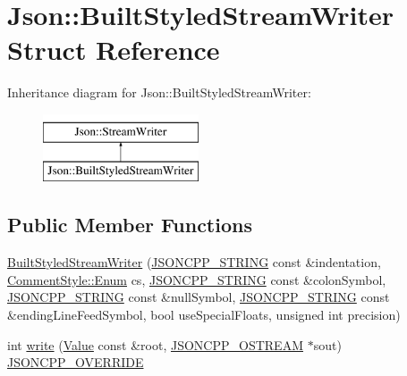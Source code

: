 \hypertarget{struct_json_1_1_built_styled_stream_writer}{}\section{Json\+:\+:Built\+Styled\+Stream\+Writer Struct Reference}
\label{struct_json_1_1_built_styled_stream_writer}
Inheritance diagram for Json\+:\+:Built\+Styled\+Stream\+Writer\+:\begin{figure}[H]
\begin{center}
\leavevmode
\includegraphics[height=2.000000cm]{struct_json_1_1_built_styled_stream_writer}
\end{center}
\end{figure}
\subsection*{Public Member Functions}
\begin{DoxyCompactItemize}
\item 
\hyperlink{struct_json_1_1_built_styled_stream_writer_adf11b7d1ee3c68d096b7c662ee85948e}{Built\+Styled\+Stream\+Writer} (\hyperlink{config_8h_a1e723f95759de062585bc4a8fd3fa4be}{J\+S\+O\+N\+C\+P\+P\+\_\+\+S\+T\+R\+I\+NG} const \&indentation, \hyperlink{struct_json_1_1_comment_style_a51fc08f3518fd81eba12f340d19a3d0c}{Comment\+Style\+::\+Enum} cs, \hyperlink{config_8h_a1e723f95759de062585bc4a8fd3fa4be}{J\+S\+O\+N\+C\+P\+P\+\_\+\+S\+T\+R\+I\+NG} const \&colon\+Symbol, \hyperlink{config_8h_a1e723f95759de062585bc4a8fd3fa4be}{J\+S\+O\+N\+C\+P\+P\+\_\+\+S\+T\+R\+I\+NG} const \&null\+Symbol, \hyperlink{config_8h_a1e723f95759de062585bc4a8fd3fa4be}{J\+S\+O\+N\+C\+P\+P\+\_\+\+S\+T\+R\+I\+NG} const \&ending\+Line\+Feed\+Symbol, bool use\+Special\+Floats, unsigned int precision)
\item 
int \hyperlink{struct_json_1_1_built_styled_stream_writer_a823cdb1afabb6b0d5f39bcd5a6a6f747}{write} (\hyperlink{class_json_1_1_value}{Value} const \&root, \hyperlink{config_8h_a37a25be5fca174927780caeb280094ce}{J\+S\+O\+N\+C\+P\+P\+\_\+\+O\+S\+T\+R\+E\+AM} $\ast$sout) \hyperlink{config_8h_a824d6199c91488107e443226fa6022c5}{J\+S\+O\+N\+C\+P\+P\+\_\+\+O\+V\+E\+R\+R\+I\+DE}
\end{DoxyCompactItemize}
